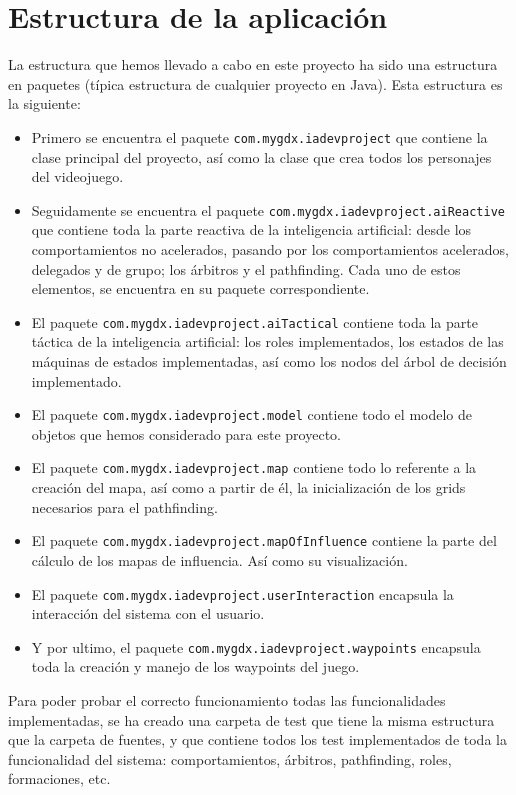 \medskip
\section{Estructura de la aplicación}
La estructura que hemos llevado a cabo en este proyecto ha sido una estructura en paquetes (típica estructura de cualquier proyecto en Java). Esta estructura es la siguiente:
\begin{itemize}
 \item Primero se encuentra el paquete \texttt{com.mygdx.iadevproject} que contiene la clase principal del proyecto, así como la clase que crea todos los personajes del videojuego.
 \item Seguidamente se encuentra el paquete \texttt{com.mygdx.iadevproject.aiReactive} que contiene toda la parte reactiva de la inteligencia artificial: desde los comportamientos no acelerados, pasando por los comportamientos acelerados, delegados y de grupo; los árbitros y el pathfinding. Cada uno de estos elementos, se encuentra en su paquete correspondiente.
 \item El paquete \texttt{com.mygdx.iadevproject.aiTactical} contiene toda la parte táctica de la inteligencia artificial: los roles implementados, los estados de las máquinas de estados implementadas, así como los nodos del árbol de decisión implementado.
 \item El paquete \texttt{com.mygdx.iadevproject.model} contiene todo el modelo de objetos que hemos considerado para este proyecto.
 \item El paquete \texttt{com.mygdx.iadevproject.map} contiene todo lo referente a la creación del mapa, así como a partir de él, la inicialización de los grids necesarios para el pathfinding.
 \item El paquete \texttt{com.mygdx.iadevproject.mapOfInfluence} contiene la parte del cálculo de los mapas de influencia. Así como su visualización.
 \item El paquete \texttt{com.mygdx.iadevproject.userInteraction} encapsula la interacción del sistema con el usuario.
 \item Y por ultimo, el paquete \texttt{com.mygdx.iadevproject.waypoints} encapsula toda la creación y manejo de los waypoints del juego.
\end{itemize}

Para poder probar el correcto funcionamiento todas las funcionalidades implementadas, se ha creado una carpeta de test que tiene la misma estructura que la carpeta de fuentes, y que contiene todos los test implementados de toda la funcionalidad del sistema: comportamientos, árbitros, pathfinding, roles, formaciones, etc.